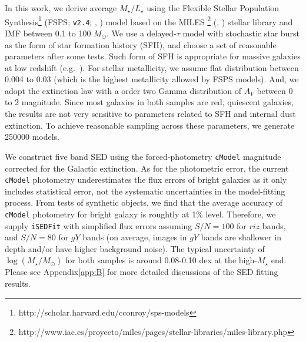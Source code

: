 \documentclass{emulateapj}
\def\msun{$M_\odot$}
\def\cmodel{\texttt{cModel}}
\def\mstar{{$M_{\star}$}}
\def\logms{{$\log (M_{\star}/M_{\odot})$}}
\def\m2l{{$M_{\star}/L_{\star}$}}
\newcommand{\song}[1]{\textcolor{magenta}{\textbf{[Song: #1]}}}
\begin{document}
\begin{CJK*}{UTF8}{gbsn}
    In this work, we derive average \m2l{} using the Flexible Stellar Population 
    Synthesis\footnote{http://scholar.harvard.edu/cconroy/sps-models}
    (FSPS; \texttt{v2.4}; \citealt{FSPS}, \citealt{Conroy2010}) model based on the MILES
    \footnote{http://www.iac.es/proyecto/miles/pages/stellar-libraries/miles-library.php}
    (\citealt{MILES1}, \citealt{MILES2}) stellar library and \citet{Chabrier2003} 
    IMF between 0.1 to 100 \msun. 
    We use a delayed-$\tau$ model with stochastic star burst as the form of star 
    formation history (SFH), and choose a set of reasonable parameters after some tests.  
    Such form of SFH is appropriate for massive galaxies at low redshift 
    (e.g.\ \citealt{Kauffmann2003}). 
    For stellar metallicity, we assume flat distribution between 0.004 to 0.03 (which is 
    the highest metallicity allowed by FSPS models).  
    And, we adopt the \citet{Calzetti2000} extinction law with a order two Gamma 
    distribution of $A_{V}$ between 0 to 2 magnitude.
    Since most galaxies in both samples are red, quiescent galaxies, the results are 
    not very sensitive to parameters related to SFH and internal dust extinction. 
    To achieve reasonable sampling across these parameters, we generate 250000 models. 
    
    We construct five band SED using the forced-photometry \cmodel{} magnitude corrected 
    for the Galactic extinction. 
    As for the photometric error, the current \cmodel{} photometry underestimates 
    the flux errors of bright galaxies as it only includes statistical error, not the 
    systematic uncertainties in the model-fitting process.  
    From tests of synthetic objects, we find that the average accuracy of \cmodel{} 
    photometry for bright galaxy is roughtly at 1\% level. 
    Therefore, we supply \texttt{iSEDFit} with simplified flux errors assuming $S/N = 100$ 
    for $riz$ bands, and $S/N = 80$ for $gY$ bands (on average, images in $gY$ bands are 
    shallower in depth and/or have higher background noise).  
    The typical uncertainty of \logms{} for both samples is around 0.08-0.10 dex at the 
    high-\mstar{} end. 
    Please see Appendix\ref{app:B} for more detailed discussions of the SED fitting
    results.  
    


\end{CJK*}
\end{document}
